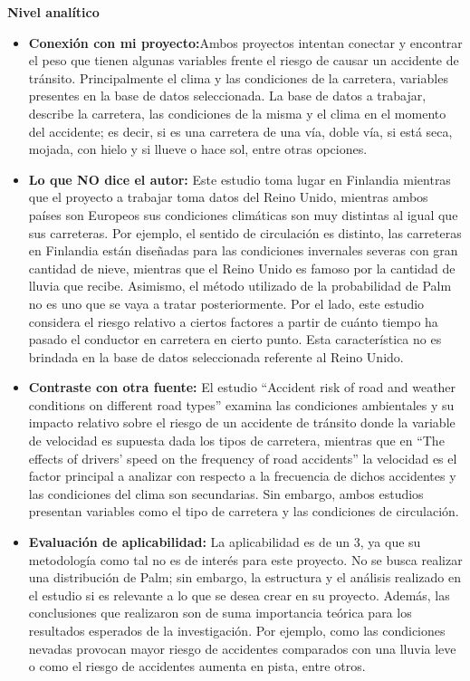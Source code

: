 \documentclass[12pt]{article}
\begin{document}
\textbf{Nivel analítico }
\begin{itemize}
	\item \textbf{Conexión con mi proyecto:}Ambos proyectos intentan conectar y encontrar el peso que tienen algunas variables frente el riesgo de causar un accidente de tránsito. Principalmente el clima y las condiciones de la carretera, variables presentes en la base de datos seleccionada. La base de datos a trabajar, describe la carretera, las condiciones de la misma y el clima en el momento del accidente; es decir, si es una carretera de una vía, doble vía, si está seca, mojada, con hielo y si llueve o hace sol, entre otras opciones.  
 
	\item \textbf{Lo que NO dice el autor:} Este estudio toma lugar en Finlandia mientras que el proyecto a trabajar toma datos del Reino Unido, mientras ambos países son Europeos sus condiciones climáticas son muy distintas al igual que sus carreteras. Por ejemplo, el sentido de circulación es distinto, las carreteras en Finlandia están diseñadas para las condiciones invernales severas con gran cantidad de nieve, mientras que el Reino Unido es famoso por la cantidad de lluvia que recibe. Asimismo, el método utilizado de la probabilidad de Palm no es uno que se vaya a tratar posteriormente. Por el lado, este estudio considera el riesgo relativo a ciertos factores a partir de cuánto tiempo ha pasado el conductor en carretera en cierto punto. Esta característica no es brindada en la base de datos seleccionada referente al Reino Unido.  
 
	\item \textbf{Contraste con otra fuente:} El estudio “Accident risk of road and weather conditions on different road types” examina las condiciones ambientales y su impacto relativo sobre el riesgo de un accidente de tránsito donde la variable de velocidad es supuesta dada los tipos de carretera, mientras que en “The effects of drivers' speed on the frequency of road accidents” la velocidad es el factor principal a analizar con respecto a la frecuencia de dichos accidentes y las condiciones del clima son secundarias. Sin embargo, ambos estudios presentan variables como el tipo de carretera y las condiciones de circulación.    
 
	\item \textbf{Evaluación de aplicabilidad:} La aplicabilidad es de un 3, ya que su metodología como tal no es de interés para este proyecto. No se busca realizar una distribución de Palm; sin embargo, la estructura y el análisis realizado en el estudio si es relevante a lo que se desea crear en su proyecto. Además, las conclusiones que realizaron son de suma importancia teórica para los resultados esperados de la investigación. Por ejemplo, como las condiciones nevadas provocan mayor riesgo de accidentes comparados con una lluvia leve o como el riesgo de accidentes aumenta en pista, entre otros.  
 

\end{itemize}
\end{document}
